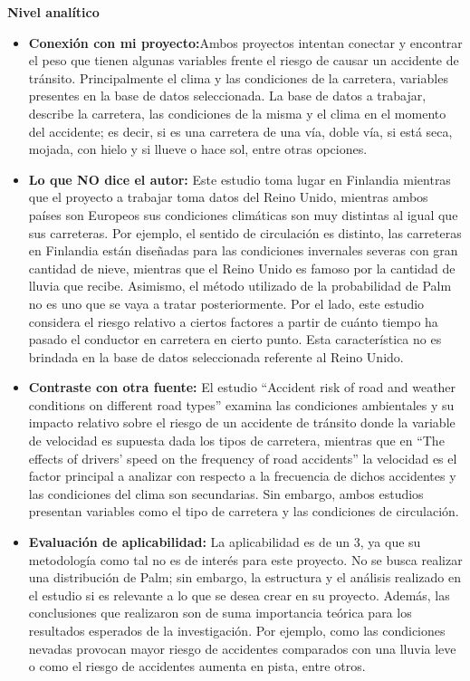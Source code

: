 \documentclass[12pt]{article}
\begin{document}
\textbf{Nivel analítico }
\begin{itemize}
	\item \textbf{Conexión con mi proyecto:}Ambos proyectos intentan conectar y encontrar el peso que tienen algunas variables frente el riesgo de causar un accidente de tránsito. Principalmente el clima y las condiciones de la carretera, variables presentes en la base de datos seleccionada. La base de datos a trabajar, describe la carretera, las condiciones de la misma y el clima en el momento del accidente; es decir, si es una carretera de una vía, doble vía, si está seca, mojada, con hielo y si llueve o hace sol, entre otras opciones.  
 
	\item \textbf{Lo que NO dice el autor:} Este estudio toma lugar en Finlandia mientras que el proyecto a trabajar toma datos del Reino Unido, mientras ambos países son Europeos sus condiciones climáticas son muy distintas al igual que sus carreteras. Por ejemplo, el sentido de circulación es distinto, las carreteras en Finlandia están diseñadas para las condiciones invernales severas con gran cantidad de nieve, mientras que el Reino Unido es famoso por la cantidad de lluvia que recibe. Asimismo, el método utilizado de la probabilidad de Palm no es uno que se vaya a tratar posteriormente. Por el lado, este estudio considera el riesgo relativo a ciertos factores a partir de cuánto tiempo ha pasado el conductor en carretera en cierto punto. Esta característica no es brindada en la base de datos seleccionada referente al Reino Unido.  
 
	\item \textbf{Contraste con otra fuente:} El estudio “Accident risk of road and weather conditions on different road types” examina las condiciones ambientales y su impacto relativo sobre el riesgo de un accidente de tránsito donde la variable de velocidad es supuesta dada los tipos de carretera, mientras que en “The effects of drivers' speed on the frequency of road accidents” la velocidad es el factor principal a analizar con respecto a la frecuencia de dichos accidentes y las condiciones del clima son secundarias. Sin embargo, ambos estudios presentan variables como el tipo de carretera y las condiciones de circulación.    
 
	\item \textbf{Evaluación de aplicabilidad:} La aplicabilidad es de un 3, ya que su metodología como tal no es de interés para este proyecto. No se busca realizar una distribución de Palm; sin embargo, la estructura y el análisis realizado en el estudio si es relevante a lo que se desea crear en su proyecto. Además, las conclusiones que realizaron son de suma importancia teórica para los resultados esperados de la investigación. Por ejemplo, como las condiciones nevadas provocan mayor riesgo de accidentes comparados con una lluvia leve o como el riesgo de accidentes aumenta en pista, entre otros.  
 

\end{itemize}
\end{document}
